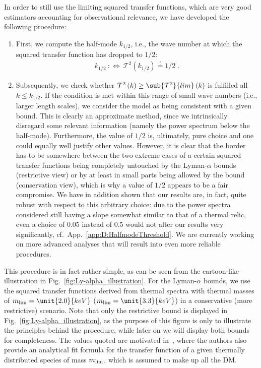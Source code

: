 In order to still use the limiting squared transfer functions, which are very good estimators accounting for observational relevance, we have developed the following procedure:
\begin{enumerate}

\item First, we compute the half-mode $k_{1/2}$, i.e., the wave number at which the squared transfer function has dropped to $1/2$:
\begin{align}
 k_{1/2}\ :\Longleftrightarrow\ \mathcal{T}^2\left(k_{1/2}\right) \stackrel{!}{=} 1/2 \;.
 \label{eq:Def:Half-mode}
\end{align}

\item Subsequently, we check whether $\mathcal{T}^2\left(k\right) \geq \sub{\mathcal{T}^2}{lim}\left(k\right)$ is fulfilled all $k \leq k_{1/2}$. If the condition is met within this range of small wave numbers (i.e., larger length scales), we consider the model as being consistent with a given bound. This is clearly an approximate method, since we intrinsically disregard some relevant information (namely the power spectrum below the half-mode). Furthermore, the value of $1/2$ is, ultimately, pure choice and one could equally well justify other values. However, it is clear that the border has to be somewhere between the two extreme cases of a certain squared transfer functions being completely untouched by the Lyman-$\alpha$ bounds (restrictive view) or by at least in small parts being allowed by the bound (conservation view), which is why a value of $1/2$ appears to be a fair compromise. We have in addition shown that our results are, in fact, quite robust with respect to this arbitrary choice: due to the power spectra considered still having a slope somewhat similar to that of a thermal relic, even a choice of $0.05$ instead of $0.5$ would not alter our results very significantly, cf.\ App.~\ref{app:D:HalfmodeThreshold}. We are currently working on more advanced analyses that will result into even more reliable procedures.

\end{enumerate}
This procedure is in fact rather simple, as can be seen from the cartoon-like illustration in Fig.~\ref{fig:Ly-alpha_illustration}. For the Lyman-$\alpha$ bounds, we use the squared transfer functions derived from thermal spectra with thermal masses of $m_{\rm lim} = \unit{2.0}{keV}$ ($m_{\rm lim} = \unit{3.3}{keV}$) in a conservative (more restrictive) scenario. Note that only the restrictive bound is displayed in Fig.~\ref{fig:Ly-alpha_illustration}, as the purpose of this figure is only to illustrate the principles behind the procedure, while later on we will display both bounds for completeness. The values quoted are motivated in~\cite{Viel:2005qj}, where the authors also provide an analytical fit formula for the transfer function of a given thermally distributed species of mass $m_{\rm lim}$, which is assumed to make up all the DM.

